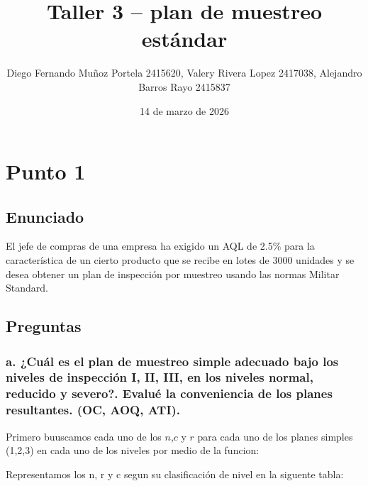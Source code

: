 \documentclass[
  12pt,
]{article}
\title{Taller 3 -- plan de muestreo estándar}
\author{Diego Fernando Muñoz Portela 2415620, Valery Rivera Lopez
2417038, Alejandro Barros Rayo 2415837}
\date{14 de marzo de 2026}
\begin{document}
\maketitle

{
\setcounter{tocdepth}{3}
\tableofcontents
}
\section{Punto 1}\label{punto-1}

\subsection{Enunciado}\label{enunciado}

El jefe de compras de una empresa ha exigido un AQL de 2.5\% para la
característica de un cierto producto que se recibe en lotes de 3000
unidades y se desea obtener un plan de inspección por muestreo usando
las normas Militar Standard.

\subsection{Preguntas}\label{preguntas}

\subsubsection{a. ¿Cuál es el plan de muestreo simple adecuado bajo los
niveles de inspección I, II, III, en los niveles normal, reducido y
severo?. Evalué la conveniencia de los planes resultantes. (OC, AOQ,
ATI).}\label{a.-cuuxe1l-es-el-plan-de-muestreo-simple-adecuado-bajo-los-niveles-de-inspecciuxf3n-i-ii-iii-en-los-niveles-normal-reducido-y-severo.-evaluuxe9-la-conveniencia-de-los-planes-resultantes.-oc-aoq-ati.}

Primero buuscamos cada uno de los \(n\),\(c\) y \(r\) para cada uno de
los planes simples (1,2,3) en cada uno de los niveles por medio de la
funcion:

Representamos los n, r y c segun su clasificación de nivel en la
siguente tabla:
\end{document}
